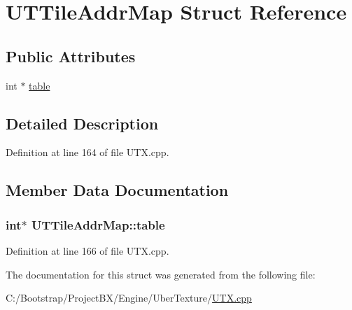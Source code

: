 \hypertarget{struct_u_t_tile_addr_map}{
\section{UTTileAddrMap Struct Reference}
\label{struct_u_t_tile_addr_map}
}
\subsection*{Public Attributes}
\begin{CompactItemize}
\item 
int $\ast$ \hyperlink{struct_u_t_tile_addr_map_f987a8fc096784ccf55039101c5d33d0}{table}
\end{CompactItemize}


\subsection{Detailed Description}


Definition at line 164 of file UTX.cpp.

\subsection{Member Data Documentation}
\hypertarget{struct_u_t_tile_addr_map_f987a8fc096784ccf55039101c5d33d0}{
\subsubsection[{table}]{\setlength{\rightskip}{0pt plus 5cm}int$\ast$ {\bf UTTileAddrMap::table}}}
\label{struct_u_t_tile_addr_map_f987a8fc096784ccf55039101c5d33d0}




Definition at line 166 of file UTX.cpp.

The documentation for this struct was generated from the following file:\begin{CompactItemize}
\item 
C:/Bootstrap/ProjectBX/Engine/UberTexture/\hyperlink{_u_t_x_8cpp}{UTX.cpp}\end{CompactItemize}
